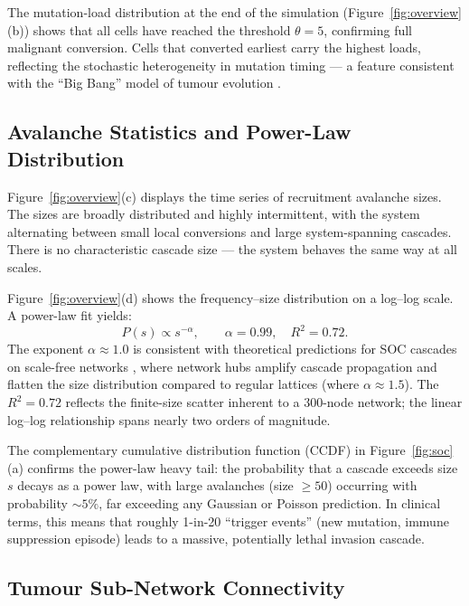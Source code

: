 \documentclass[12pt,a4paper]{article}
\begin{document}
The mutation-load distribution at the end of the simulation
(Figure~\ref{fig:overview}(b)) shows that all cells have reached the threshold
$\theta = 5$, confirming full malignant conversion.  Cells that converted
earliest carry the highest loads, reflecting the stochastic heterogeneity in
mutation timing --- a feature consistent with the ``Big Bang'' model of tumour
evolution \citep{sottoriva2015big}.

\subsection{Avalanche Statistics and Power-Law Distribution}

Figure~\ref{fig:overview}(c) displays the time series of recruitment avalanche
sizes.  The sizes are broadly distributed and highly intermittent, with the
system alternating between small local conversions and large system-spanning
cascades.  There is no characteristic cascade size --- the system behaves the
same way at all scales.

Figure~\ref{fig:overview}(d) shows the frequency--size distribution on a
log--log scale.  A power-law fit yields:
\begin{equation}
  P(s) \propto s^{-\alpha}, \qquad \alpha = 0.99, \quad R^2 = 0.72.
\end{equation}
The exponent $\alpha \approx 1.0$ is consistent with theoretical predictions
for SOC cascades on scale-free networks \citep{goh2003sandpile}, where network
hubs amplify cascade propagation and flatten the size distribution compared
to regular lattices (where $\alpha \approx 1.5$).  The $R^2 = 0.72$ reflects
the finite-size scatter inherent to a 300-node network; the linear
log--log relationship spans nearly two orders of magnitude.

The complementary cumulative distribution function (CCDF) in
Figure~\ref{fig:soc}(a) confirms the power-law heavy tail: the probability
that a cascade exceeds size $s$ decays as a power law, with large avalanches
(size $\geq 50$) occurring with probability $\sim 5\%$, far exceeding
any Gaussian or Poisson prediction.  In clinical terms, this means that
roughly 1-in-20 ``trigger events'' (new mutation, immune suppression episode)
leads to a massive, potentially lethal invasion cascade.

\subsection{Tumour Sub-Network Connectivity}
\end{document}
